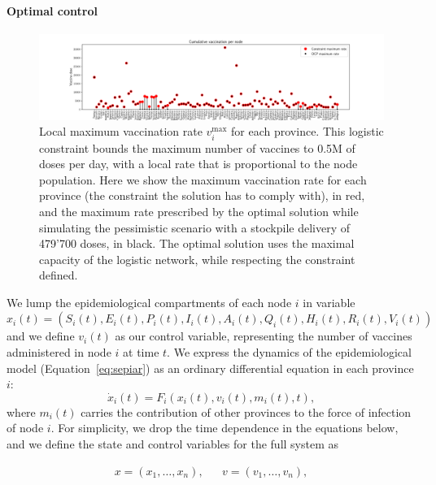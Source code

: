 \paragraph{Optimal control}
\begin{figure}[!ht]
    \centering
    \includegraphics{fig_italy-ocp/figuresSI/SI_constraint_dist.pdf}
    \caption[Local maximum vaccination rate for each province]{Local maximum vaccination rate $v_i^\mathrm{max}$ for each province. This logistic constraint bounds the maximum number of vaccines to 0.5M of doses per day, with a local rate that is proportional to the node population. Here we show the maximum vaccination rate for each province (the constraint the solution has to comply with), in red, and the maximum rate prescribed by the optimal solution while simulating the pessimistic scenario with a stockpile delivery of 479'700 doses, in black. The optimal solution uses the maximal capacity of the logistic network, while respecting the constraint defined.}
    \label{fig:OC_logistic_constraints}
\end{figure}

We lump the epidemiological compartments of each node $i$ in variable $x_i(t)=(S_i(t),E_i(t),P_i(t),I_i(t),A_i(t),Q_i(t),H_i(t),R_i(t),V_i(t))$ and we define $v_i(t)$ as our control variable, representing the number of vaccines administered in node $i$ at time $t$. We express the dynamics of the epidemiological model (Equation~\eqref{eq:sepiar}) as an ordinary differential equation in each province $i$:
\begin{equation}
    \label{eq:sepiar_compact}
    \dot x_i(t) = F_i(x_i(t),v_i(t), m_i(t), t),
\end{equation}
where $m_i(t)$ carries the contribution of other provinces to the force of infection of node $i$. For simplicity, we drop the time dependence in the equations below, and we define the state and control variables for the full system as

\begin{align*}
    x = (x_1,\ldots,x_n), && v = (v_1,\ldots,v_n),
\end{align*}

